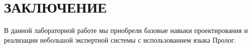 \section*{ЗАКЛЮЧЕНИЕ}

В данной лабораторной работе мы приобрели базовые навыки проектирования
и реализации небольшой экспертной системы с использованием языка Пролог.

\newpage